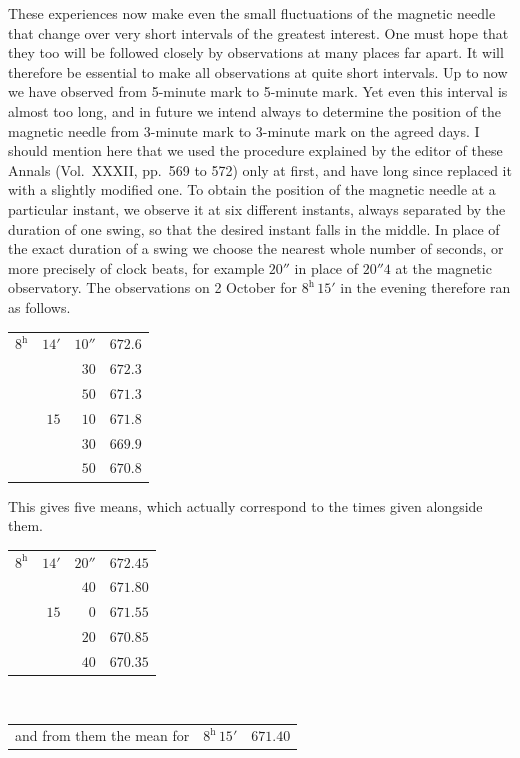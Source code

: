 These experiences now make even the small fluctuations of the magnetic needle that change over very short intervals of the greatest interest. One must hope that they too will be followed closely by observations at many places far apart. It will therefore be essential to make all observations at quite short intervals. Up to now we have observed from 5-minute mark to 5-minute mark. Yet even this interval is almost too long, and in future we intend always to determine the position of the magnetic needle from 3-minute mark to 3-minute mark on the agreed days. I should mention here that we used the procedure explained by the editor of these Annals (Vol.\ XXXII, pp.\ 569 to 572) only at first, and have long since replaced it with a slightly modified one. To obtain the position of the magnetic needle at a particular instant, we observe it at six different instants, always separated by the duration of one swing, so that the desired instant falls in the middle. In place of the exact duration of a swing we choose the nearest whole number of seconds, or more precisely of clock beats, for example $20''$ in place of $20''4$ at the magnetic observatory. The observations on 2 October for $8^{\mathrm h}\,15'$ in the evening therefore ran as follows.
\begin{center}
\begin{tabular}{rrr|r}
$8^{\mathrm h}$ & $14'$ & $10''$ & $672.6$\\
 & & $30$ & $672.3$\\
 & & $50$ & $671.3$\\
 & $15$ & $10$ & $671.8$\\
 & & $30$ & $669.9$\\
 & & $50$ & $670.8$
\end{tabular}
\end{center}
This gives five means, which actually correspond to the times given alongside them.
\begin{center}
\begin{tabular}{rrr|r}
$8^{\mathrm h}$ & $14'$ & $20''$ & $672.45$\\
 & & $40$ & $671.80$\\
 & $15$ & $0$ & $671.55$\\
 & & $20$ & $670.85$\\
 & & $40$ & $670.35$
\end{tabular}\\[2mm]
\begin{tabular}{lrr}
and from them the mean for & $8^{\mathrm h}\,15'$ & $671.40$
\end{tabular}
\end{center}

